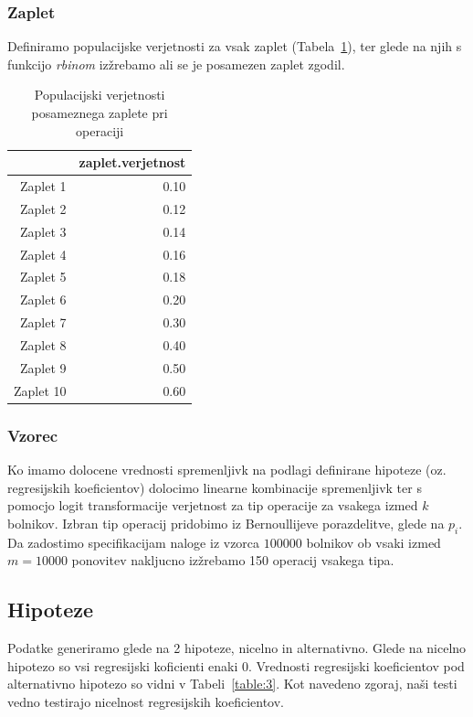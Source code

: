 \documentclass[letterpaper,11pt]{article}
\begin{document}
\subsubsection{Zaplet}
Definiramo populacijske verjetnosti za vsak zaplet (Tabela~\ref{table:2}), ter glede na njih s funkcijo \emph{rbinom} izžrebamo ali se je posamezen zaplet zgodil.

\begin{table}[ht]
\centering
\begin{tabular}{rr}
  \hline
 & zaplet.verjetnost \\ 
  \hline
Zaplet 1 & 0.10 \\ 
  Zaplet 2 & 0.12 \\ 
  Zaplet 3 & 0.14 \\ 
  Zaplet 4 & 0.16 \\ 
  Zaplet 5 & 0.18 \\ 
  Zaplet 6 & 0.20 \\ 
  Zaplet 7 & 0.30 \\ 
  Zaplet 8 & 0.40 \\ 
  Zaplet 9 & 0.50 \\ 
  Zaplet 10 & 0.60 \\ 
   \hline
\end{tabular}
\caption{Populacijski verjetnosti posameznega zaplete pri operaciji} 
\label{table:2}
\end{table}

\subsubsection{Vzorec}
Ko imamo dolocene vrednosti spremenljivk na podlagi definirane hipoteze (oz. regresijskih koeficientov) dolocimo linearne kombinacije spremenljivk ter s pomocjo logit transformacije verjetnost za tip operacije za vsakega izmed $k$ bolnikov. Izbran tip operacij pridobimo iz Bernoullijeve porazdelitve, glede na $p_i$. Da zadostimo specifikacijam naloge iz vzorca $100000$ bolnikov ob vsaki izmed $m=10000$ ponovitev nakljucno izžrebamo 150 operacij vsakega tipa.

\subsection{Hipoteze}
Podatke generiramo glede na 2 hipoteze, nicelno in alternativno. Glede na nicelno hipotezo so vsi regresijski koficienti enaki 0. Vrednosti regresijski koeficientov pod alternativno hipotezo so vidni v Tabeli~\ref{table:3}. Kot navedeno zgoraj, naši testi vedno testirajo nicelnost regresijskih koeficientov.
\end{document}
